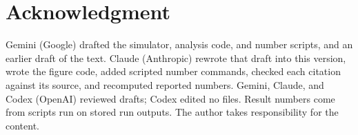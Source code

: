 \documentclass[conference]{IEEEtran}
\newif\ifanonymous
\begin{document}
\section*{Acknowledgment}
Gemini (Google) drafted the simulator, analysis code, and number scripts, and an earlier draft of the text.
Claude (Anthropic) rewrote that draft into this version, wrote the figure code, added scripted number commands, checked each
citation against its source, and recomputed reported numbers. Gemini, Claude, and Codex (OpenAI) reviewed drafts;
Codex edited no files. Result numbers come from scripts run on stored run outputs. \ifanonymous The authors take\else The author takes\fi{} responsibility
for the content.



\end{document}
